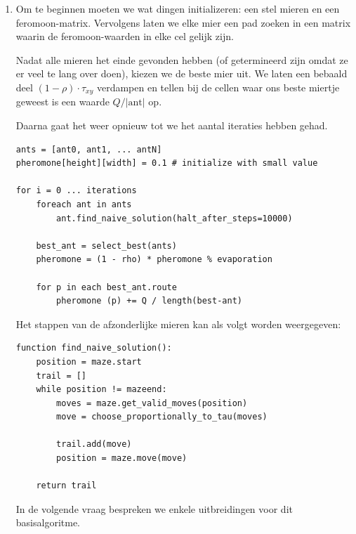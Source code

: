 \documentclass[a4paper,10pt,fleqn]{article}
\begin{document}
\begin{enumerate}[1.]
    \item Om te beginnen moeten we wat dingen initializeren: een stel mieren en een feromoon-matrix. Vervolgens laten we elke mier een pad zoeken in een matrix waarin de feromoon-waarden in elke cel gelijk zijn.

    Nadat alle mieren het einde gevonden hebben (of getermineerd zijn omdat ze er veel te lang over doen), kiezen we de beste mier uit.
    We laten een bebaald deel $(1 - \rho) \cdot \tau_{xy}$ verdampen en tellen bij de cellen waar ons beste miertje geweest is een waarde $Q/ |\text{ant}| $ op.

    Daarna gaat het weer opnieuw tot we het aantal iteraties hebben gehad.
    \begin{lstlisting}
ants = [ant0, ant1, ... antN]
pheromone[height][width] = 0.1 # initialize with small value

for i = 0 ... iterations
    foreach ant in ants
        ant.find_naive_solution(halt_after_steps=10000)

    best_ant = select_best(ants)
    pheromone = (1 - rho) * pheromone % evaporation

    for p in each best_ant.route
        pheromone (p) += Q / length(best-ant)
\end{lstlisting}

Het stappen van de afzonderlijke mieren kan als volgt worden weergegeven:
\begin{lstlisting}
function find_naive_solution():
    position = maze.start
    trail = []
    while position != mazeend:
        moves = maze.get_valid_moves(position)
        move = choose_proportionally_to_tau(moves)

        trail.add(move)
        position = maze.move(move)

    return trail
\end{lstlisting}
In de volgende vraag bespreken we enkele uitbreidingen voor dit basisalgoritme.


\end{enumerate}
\end{document}
